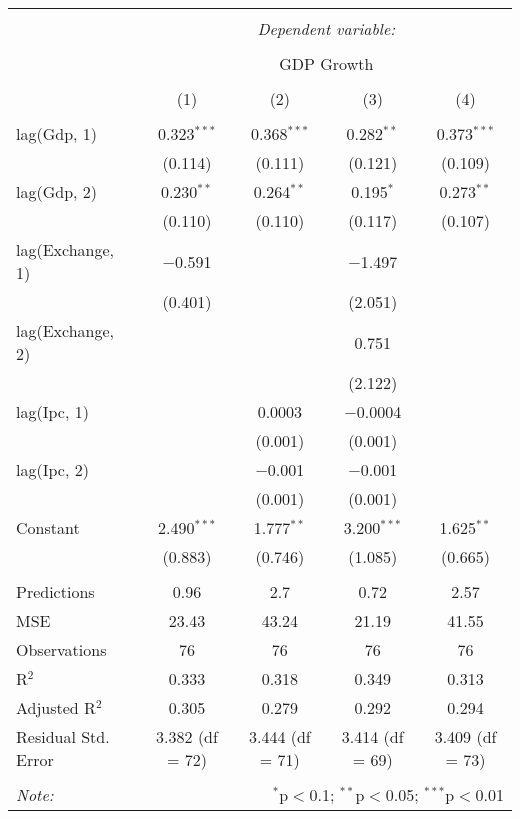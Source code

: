 
\begin{table}[H] \centering 
  \caption{} 
  \label{tb:ardl} 
\begin{tabular}{@{\extracolsep{5pt}}lcccc} 
\\[-1.8ex]\hline 
\hline \\[-1.8ex] 
 & \multicolumn{4}{c}{\textit{Dependent variable:}} \\ 
\cline{2-5} 
\\[-1.8ex] & \multicolumn{4}{c}{GDP Growth} \\ 
\\[-1.8ex] & (1) & (2) & (3) & (4)\\ 
\hline \\[-1.8ex] 
 lag(Gdp, 1) & 0.323$^{***}$ & 0.368$^{***}$ & 0.282$^{**}$ & 0.373$^{***}$ \\ 
  & (0.114) & (0.111) & (0.121) & (0.109) \\ 
  lag(Gdp, 2) & 0.230$^{**}$ & 0.264$^{**}$ & 0.195$^{*}$ & 0.273$^{**}$ \\ 
  & (0.110) & (0.110) & (0.117) & (0.107) \\ 
  lag(Exchange, 1) & $-$0.591 &  & $-$1.497 &  \\ 
  & (0.401) &  & (2.051) &  \\ 
  lag(Exchange, 2) &  &  & 0.751 &  \\ 
  &  &  & (2.122) &  \\ 
  lag(Ipc, 1) &  & 0.0003 & $-$0.0004 &  \\ 
  &  & (0.001) & (0.001) &  \\ 
  lag(Ipc, 2) &  & $-$0.001 & $-$0.001 &  \\ 
  &  & (0.001) & (0.001) &  \\ 
  Constant & 2.490$^{***}$ & 1.777$^{**}$ & 3.200$^{***}$ & 1.625$^{**}$ \\ 
  & (0.883) & (0.746) & (1.085) & (0.665) \\ 
 \hline \\[-1.8ex] 
Predictions & 0.96 & 2.7 & 0.72 & 2.57 \\ 
MSE & 23.43 & 43.24 & 21.19 & 41.55 \\ 
Observations & 76 & 76 & 76 & 76 \\ 
R$^{2}$ & 0.333 & 0.318 & 0.349 & 0.313 \\ 
Adjusted R$^{2}$ & 0.305 & 0.279 & 0.292 & 0.294 \\ 
Residual Std. Error & 3.382 (df = 72) & 3.444 (df = 71) & 3.414 (df = 69) & 3.409 (df = 73) \\ 
\hline 
\hline \\[-1.8ex] 
\textit{Note:}  & \multicolumn{4}{r}{$^{*}$p$<$0.1; $^{**}$p$<$0.05; $^{***}$p$<$0.01} \\ 
\end{tabular} 
\end{table} 
